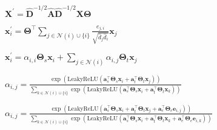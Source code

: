 
$\mathbf{X}^{\prime} = \mathbf{\hat{D}}^{-1/2} \mathbf{\hat{A}} \mathbf{\hat{D}}^{-1/2} \mathbf{X} \mathbf{\Theta}$

$\mathbf{x}^{\prime}_i = \mathbf{\Theta}^{\top} \sum_{j \in \mathcal{N}(i) \cup \{ i \}} \frac{e_{j,i}}{\sqrt{\hat{d}_j \hat{d}_i}} \mathbf{x}_j$

$\mathbf{x}^{\prime}_i = \alpha_{i,i}\mathbf{\Theta}_{s}\mathbf{x}_{i} + \sum_{j \in \mathcal{N}(i)} \alpha_{i,j}\mathbf{\Theta}_{t}\mathbf{x}_{j}$

$\alpha_{i,j} = \frac{\exp\left(\mathrm{LeakyReLU}\left(\mathbf{a}^{\top}_{s} \mathbf{\Theta}_{s}\mathbf{x}_i + \mathbf{a}^{\top}_{t} \mathbf{\Theta}_{t}\mathbf{x}_j \right)\right)} {\sum_{k \in \mathcal{N}(i) \cup \{ i \}} \exp\left(\mathrm{LeakyReLU}\left( \mathbf{a}^{\top}_{s} \mathbf{\Theta}_{s}\mathbf{x}_i + \mathbf{a}^{\top}_{t}\mathbf{\Theta}_{t}\mathbf{x}_k \right)\right)}$

$\alpha_{i,j} = \frac{\exp\left(\mathrm{LeakyReLU}\left(\mathbf{a}^{\top}_{s} \mathbf{\Theta}_{s}\mathbf{x}_i + \mathbf{a}^{\top}_{t} \mathbf{\Theta}_{t}\mathbf{x}_j+ \mathbf{a}^{\top}_{e} \mathbf{\Theta}_{e} \mathbf{e}_{i,j} \right)\right)} {\sum_{k \in \mathcal{N}(i) \cup \{ i \}} \exp\left(\mathrm{LeakyReLU}\left(\mathbf{a}^{\top}_{s} \mathbf{\Theta}_{s}\mathbf{x}_i + \mathbf{a}^{\top}_{t} \mathbf{\Theta}_{t}\mathbf{x}_k + \mathbf{a}^{\top}_{e} \mathbf{\Theta}_{e} \mathbf{e}_{i,k} \right)\right)}$